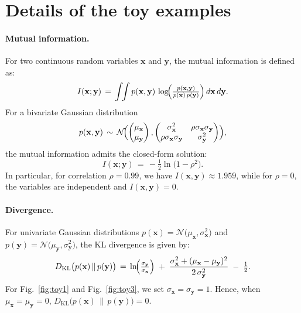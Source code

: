 


\section{Details of the toy examples}
\label{sec:toy_details}


\paragraph{Mutual information.} 
For two continuous random variables \(\mathbf{x}\) and \(\mathbf{y}\), the mutual information is defined as:
\begin{equation}
\label{eq:mi_def}
I(\mathbf{x}; \mathbf{y}) 
\,=\, 
\int \!\! \int 
p(\mathbf{x}, \mathbf{y}) 
\, \log \!\Bigl(\tfrac{p(\mathbf{x}, \mathbf{y})}{p(\mathbf{x})\,p(\mathbf{y})}\Bigr)
\, d\mathbf{x}\,d\mathbf{y}.
\end{equation}
For a bivariate Gaussian distribution 
\[
p(\mathbf{x}, \mathbf{y}) 
\,\sim\, 
\mathcal{N}\!\Bigl(
\begin{pmatrix}
\mu_\mathbf{x} \\
\mu_\mathbf{y}
\end{pmatrix}, 
\begin{pmatrix}
\sigma_\mathbf{x}^2 & \rho \sigma_\mathbf{x}\sigma_\mathbf{y} \\
\rho \sigma_\mathbf{x}\sigma_\mathbf{y}       & \sigma_\mathbf{y}^2
\end{pmatrix}\Bigr),
\]
the mutual information admits the closed-form solution:
\begin{equation}
\label{eq:mi_gauss}
I(\mathbf{x}; \mathbf{y}) 
\,=\, 
-\tfrac12\ln\bigl(1-\rho^2\bigr).
\end{equation}
In particular, for correlation \(\rho = 0.99\), we have 
\(I(\mathbf{x},\mathbf{y}) \approx 1.959\), 
while for \(\rho=0\), 
the variables are independent and \(I(\mathbf{x},\mathbf{y}) = 0\).

\paragraph{Divergence.} 
For univariate Gaussian distributions 
\(p(\mathbf{x}) = \mathcal{N}\!\bigl(\mu_\mathbf{x}, \sigma_\mathbf{x}^2\bigr)\) 
and 
\(p(\mathbf{y}) = \mathcal{N}\!\bigl(\mu_\mathbf{y}, \sigma_\mathbf{y}^2\bigr)\),
the KL divergence is given by:
\begin{equation}
\label{eq:kl_univ_gauss}
D_{\mathrm{KL}}\bigl(p(\mathbf{x})\,\|\,p(\mathbf{y})\bigr)
\,=\,
\ln\!\Bigl(\tfrac{\sigma_\mathbf{y}}{\sigma_\mathbf{x}}\Bigr)
\;+\;
\frac{\sigma_\mathbf{x}^{2} + (\mu_\mathbf{x} - \mu_\mathbf{y})^{2}}{2\,\sigma_\mathbf{y}^{2}}
\;-\;
\tfrac12.
\end{equation}
For Fig.~\ref{fig:toy1} and Fig.~\ref{fig:toy3}, we set \(\sigma_\mathbf{x} = \sigma_\mathbf{y} = 1\). 
Hence, when \(\mu_\mathbf{x} = \mu_\mathbf{y} = 0\), 
\(D_{\mathrm{KL}}\bigl(p(\mathbf{x})\,\|\,p(\mathbf{y})\bigr) = 0\).

